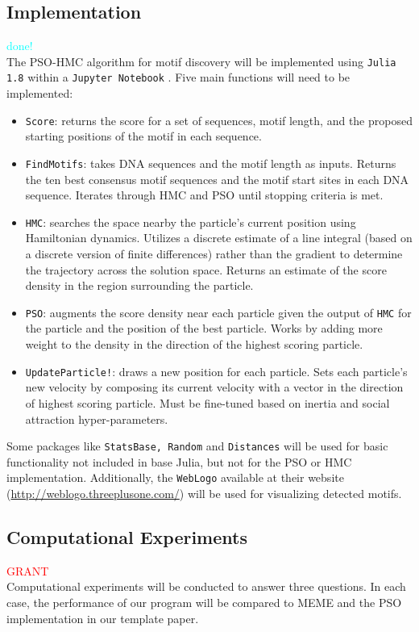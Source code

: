 \documentclass{article}
\begin{document}
\subsection{Implementation}
\textcolor{cyan}{done!} \\
The PSO-HMC algorithm for motif discovery will be implemented using \texttt{Julia 1.8} \cite{Julia-2017} within a  \texttt{Jupyter Notebook}  \cite{Kluyver2016jupyter}. Five main functions will need to be implemented:
\begin{itemize}
	\item \texttt{Score}: returns the score for a set of sequences, motif length, and the proposed starting positions of the motif in each sequence.
	\item \texttt{FindMotifs}: takes DNA sequences and the motif length as inputs. Returns the ten best consensus motif sequences and the motif start sites in each DNA sequence. Iterates through HMC and PSO until stopping criteria is met.
	\item \texttt{HMC}: searches the space nearby the particle's current position using Hamiltonian dynamics. Utilizes a discrete estimate of a line integral (based on a discrete version of finite differences) rather than the gradient to determine the trajectory across the solution space. Returns an estimate of the score density in the region surrounding the particle.
	\item \texttt{PSO}: augments the score density near each particle given the output of \texttt{HMC} for the particle and the position of the best particle. Works by adding more weight to the density in the direction of the highest scoring particle.
	\item \texttt{UpdateParticle!}: draws a new position for each particle. Sets each particle's new velocity by composing its current velocity with a vector in the direction of highest scoring particle. Must be fine-tuned based on inertia and social attraction hyper-parameters.
\end{itemize}
  Some packages like \texttt{StatsBase, Random} and \texttt{Distances} will be used for basic functionality not included in base Julia, but not for the PSO or HMC implementation. Additionally, the \texttt{WebLogo} available at their website (\url{http://weblogo.threeplusone.com/}) will be used for visualizing detected motifs.
\subsection{Computational Experiments}
\textcolor{red}{GRANT} \\  
  Computational experiments will be conducted to answer three questions. In each case, the performance of our program will be compared to MEME and the PSO implementation in our template paper.
  
\end{document}
